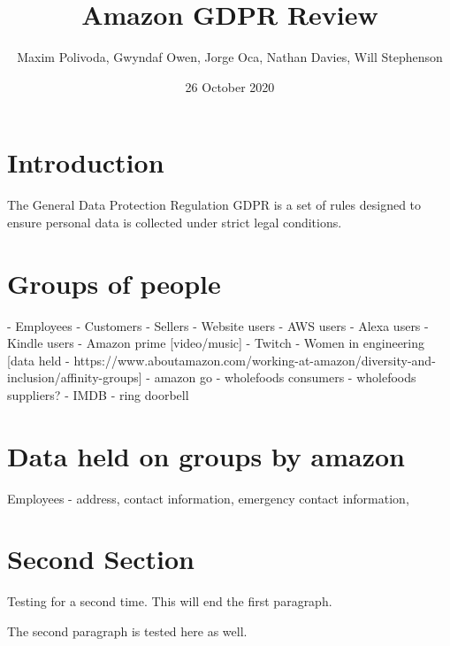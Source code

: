 \documentclass{article}
\begin{document}
\title{Amazon GDPR Review}
\author{Maxim Polivoda, Gwyndaf Owen, Jorge Oca, Nathan Davies, Will Stephenson}
\date{26 October 2020}

\maketitle

\section{Introduction}
The General Data Protection Regulation {GDPR} is a set of rules designed to ensure personal data is collected under strict legal conditions. 

\section{Groups of people}
- Employees
- Customers
- Sellers
- Website users
- AWS users
- Alexa users
- Kindle users
- Amazon prime [video/music]
- Twitch
- Women in engineering [data held - https://www.aboutamazon.com/working-at-amazon/diversity-and-inclusion/affinity-groups]
- amazon go
- wholefoods consumers
- wholefoods suppliers?
- IMDB
- ring doorbell

\section{Data held on groups by amazon}
Employees - address, contact information, emergency contact information, 

\section{Second Section}
Testing for a second time. This will end the first paragraph.

The second paragraph is tested here as well.
\end{document}

